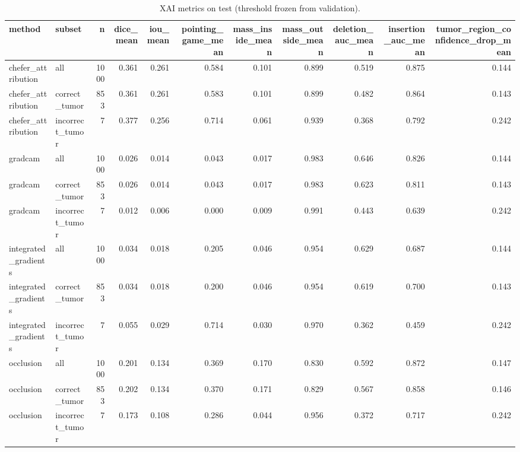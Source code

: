 \begin{table}
\caption{XAI metrics on test (threshold frozen from validation).}
\label{tab:xai-test}
\begin{tabular}{llrrrrrrrrr}
\toprule
method & subset & n & dice_mean & iou_mean & pointing_game_mean & mass_inside_mean & mass_outside_mean & deletion_auc_mean & insertion_auc_mean & tumor_region_confidence_drop_mean \\
\midrule
chefer_attribution & all & 1000 & 0.361 & 0.261 & 0.584 & 0.101 & 0.899 & 0.519 & 0.875 & 0.144 \\
chefer_attribution & correct_tumor & 853 & 0.361 & 0.261 & 0.583 & 0.101 & 0.899 & 0.482 & 0.864 & 0.143 \\
chefer_attribution & incorrect_tumor & 7 & 0.377 & 0.256 & 0.714 & 0.061 & 0.939 & 0.368 & 0.792 & 0.242 \\
gradcam & all & 1000 & 0.026 & 0.014 & 0.043 & 0.017 & 0.983 & 0.646 & 0.826 & 0.144 \\
gradcam & correct_tumor & 853 & 0.026 & 0.014 & 0.043 & 0.017 & 0.983 & 0.623 & 0.811 & 0.143 \\
gradcam & incorrect_tumor & 7 & 0.012 & 0.006 & 0.000 & 0.009 & 0.991 & 0.443 & 0.639 & 0.242 \\
integrated_gradients & all & 1000 & 0.034 & 0.018 & 0.205 & 0.046 & 0.954 & 0.629 & 0.687 & 0.144 \\
integrated_gradients & correct_tumor & 853 & 0.034 & 0.018 & 0.200 & 0.046 & 0.954 & 0.619 & 0.700 & 0.143 \\
integrated_gradients & incorrect_tumor & 7 & 0.055 & 0.029 & 0.714 & 0.030 & 0.970 & 0.362 & 0.459 & 0.242 \\
occlusion & all & 1000 & 0.201 & 0.134 & 0.369 & 0.170 & 0.830 & 0.592 & 0.872 & 0.147 \\
occlusion & correct_tumor & 853 & 0.202 & 0.134 & 0.370 & 0.171 & 0.829 & 0.567 & 0.858 & 0.146 \\
occlusion & incorrect_tumor & 7 & 0.173 & 0.108 & 0.286 & 0.044 & 0.956 & 0.372 & 0.717 & 0.242 \\
\bottomrule
\end{tabular}
\end{table}
